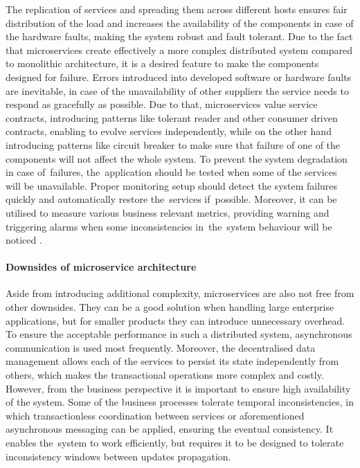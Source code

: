The replication of services and spreading them across different hosts ensures fair distribution of the load and increases the availability of the components in case of the hardware faults, making the system robust and fault tolerant. Due to the fact that microservices create effectively a more complex distributed system compared to monolithic architecture, it is a desired feature to make the components designed for failure. Errors introduced into developed software or hardware faults are inevitable, in case of the unavailability of other suppliers the service needs to respond as gracefully as possible. Due to that, microservices value service contracts, introducing patterns like tolerant reader and other consumer driven contracts, enabling to evolve services independently, while on the other hand introducing patterns like circuit breaker to make sure that failure of one of the components will not affect the whole system. To prevent the system degradation in case of~failures, the~application should be tested when some of the services will be unavailable. Proper monitoring setup should detect the system failures quickly and automatically restore the~services if~possible. Moreover, it can be utilised to measure various business relevant metrics, providing warning and triggering alarms when some inconsistencies in~the~system behaviour will be noticed \cite{MicroservicesHowToMakeYourApplicationScale}.

\paragraph{Downsides of microservice architecture}

Aside from introducing additional complexity, microservices are also not free from other downsides. They can be a good solution when handling large enterprise applications, but for smaller products they can introduce unnecessary overhead. To ensure the acceptable performance in such a distributed system, asynchronous communication is used most frequently. Moreover, the decentralised data management allows each of the services to persist its state independently from others, which makes the transactional operations more complex and costly. However, from the business perspective it is important to ensure high availability of the system. Some of the business processes tolerate temporal inconsistencies, in which transactionless coordination between services or aforementioned asynchronous messaging can be applied, ensuring the eventual consistency. It enables the~system to work efficiently, but requires it to be designed to tolerate inconsistency windows between updates propagation.

